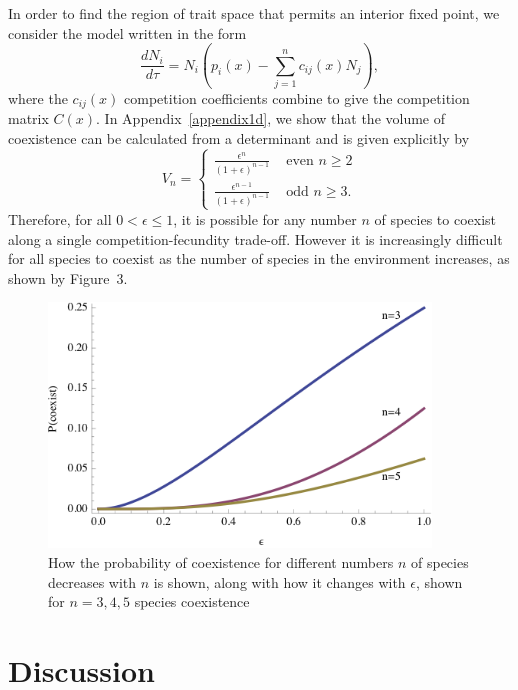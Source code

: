In order to find the region of trait space that permits an interior fixed point, we consider the model written in the form
\begin{equation}
\frac{dN_i}{d\tau}=N_i\left(p_i(x) - \sum_{j=1}^n c_{ij}(x)N_j\right),
\end{equation}
where the $c_{ij}(x)$ competition coefficients combine to give the competition matrix $C(x)$. In Appendix~\ref{appendix1d}, we show that the volume of coexistence can be calculated from a determinant and is given explicitly by
\[
V_{n}=
\left\{
\begin{array}{rl}
\frac{\epsilon^{n}}{(1+\epsilon)^{n-1}} & \mbox{ even }n\geq 2\\
\frac{\epsilon^{n-1}}{(1+\epsilon)^{n-1}} & \mbox{ odd }n\geq 3. 
\end{array} \right.
\]
Therefore, for all $0<\epsilon \leq1$, it is possible for any number $n$ of species to coexist along a single competition-fecundity trade-off. However it is increasingly difficult for all species to coexist as the number of species in the environment increases, as shown by Figure~3.

\begin{figure}[htbp]
   \centering
   \includegraphics[width=4in]{Figure3}
   \caption{How the probability of coexistence for different numbers $n$ of species decreases with $n$ is shown, along with how it changes with $\epsilon$, shown for $n=3,4,5$ species coexistence}
   \label{fig:ndif}
\end{figure}


\section{Discussion}

